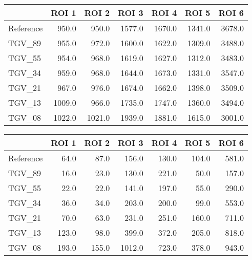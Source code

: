 \begin{tabular}{lrrrrrr}
\toprule
{} &   ROI 1 &   ROI 2 &   ROI 3 &   ROI 4 &   ROI 5 &   ROI 6 \\
\midrule
Reference &   950.0 &   950.0 &  1577.0 &  1670.0 &  1341.0 &  3678.0 \\
TGV\_89    &   955.0 &   972.0 &  1600.0 &  1622.0 &  1309.0 &  3488.0 \\
TGV\_55    &   954.0 &   968.0 &  1619.0 &  1627.0 &  1312.0 &  3483.0 \\
TGV\_34    &   959.0 &   968.0 &  1644.0 &  1673.0 &  1331.0 &  3547.0 \\
TGV\_21    &   967.0 &   976.0 &  1674.0 &  1662.0 &  1398.0 &  3509.0 \\
TGV\_13    &  1009.0 &   966.0 &  1735.0 &  1747.0 &  1360.0 &  3494.0 \\
TGV\_08    &  1022.0 &  1021.0 &  1939.0 &  1881.0 &  1615.0 &  3001.0 \\
\bottomrule
\end{tabular}
\begin{tabular}{lrrrrrr}
\toprule
{} &  ROI 1 &  ROI 2 &   ROI 3 &  ROI 4 &  ROI 5 &  ROI 6 \\
\midrule
Reference &   64.0 &   87.0 &   156.0 &  130.0 &  104.0 &  581.0 \\
TGV\_89    &   16.0 &   23.0 &   130.0 &  221.0 &   50.0 &  157.0 \\
TGV\_55    &   22.0 &   22.0 &   141.0 &  197.0 &   55.0 &  290.0 \\
TGV\_34    &   36.0 &   34.0 &   203.0 &  200.0 &   99.0 &  553.0 \\
TGV\_21    &   70.0 &   63.0 &   231.0 &  251.0 &  160.0 &  711.0 \\
TGV\_13    &  123.0 &   98.0 &   399.0 &  372.0 &  205.0 &  818.0 \\
TGV\_08    &  193.0 &  155.0 &  1012.0 &  723.0 &  378.0 &  943.0 \\
\bottomrule
\end{tabular}
